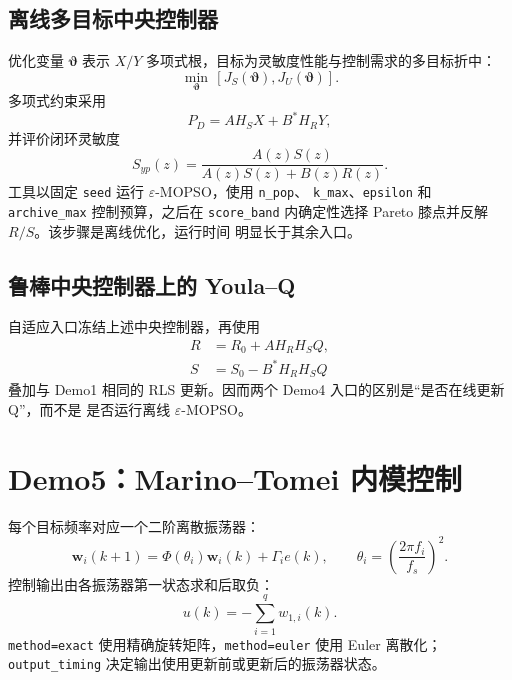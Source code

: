 \documentclass[UTF8,11pt,a4paper]{ctexart}
\begin{document}
\subsection{离线多目标中央控制器}

优化变量 $\bm\vartheta$ 表示 $X/Y$ 多项式根，目标为灵敏度性能与控制需求的多目标折中：
\begin{equation}
  \min_{\bm\vartheta}\,[J_S(\bm\vartheta),J_U(\bm\vartheta)].
\end{equation}
多项式约束采用
\begin{equation}
  P_D=A H_S X+B^*H_RY,
\end{equation}
并评价闭环灵敏度
\begin{equation}
S_{yp}(z)=\frac{A(z)S(z)}{A(z)S(z)+B(z)R(z)}.
\end{equation}
工具以固定 \texttt{seed} 运行 $\varepsilon$-MOPSO，使用 \texttt{n\_pop}、
\texttt{k\_max}、\texttt{epsilon} 和 \texttt{archive\_max} 控制预算，之后在
\texttt{score\_band} 内确定性选择 Pareto 膝点并反解 $R/S$。该步骤是离线优化，运行时间
明显长于其余入口。

\subsection{鲁棒中央控制器上的 Youla--Q}

自适应入口冻结上述中央控制器，再使用
\begin{align}
R&=R_0+A H_RH_SQ,\\
S&=S_0-B^*H_RH_SQ
\end{align}
叠加与 Demo1 相同的 RLS 更新。因而两个 Demo4 入口的区别是“是否在线更新 Q”，而不是
是否运行离线 $\varepsilon$-MOPSO。

\section{Demo5：Marino--Tomei 内模控制}

每个目标频率对应一个二阶离散振荡器：
\begin{equation}
\bm w_i(k+1)=\Phi(\theta_i)\bm w_i(k)+\Gamma_i e(k),\qquad
\theta_i=\left(\frac{2\pi f_i}{f_s}\right)^2.
\end{equation}
控制输出由各振荡器第一状态求和后取负：
\begin{equation}
u(k)=-\sum_{i=1}^{q}w_{1,i}(k).
\end{equation}
\texttt{method=exact} 使用精确旋转矩阵，\texttt{method=euler} 使用 Euler 离散化；
\texttt{output\_timing} 决定输出使用更新前或更新后的振荡器状态。
\end{document}
